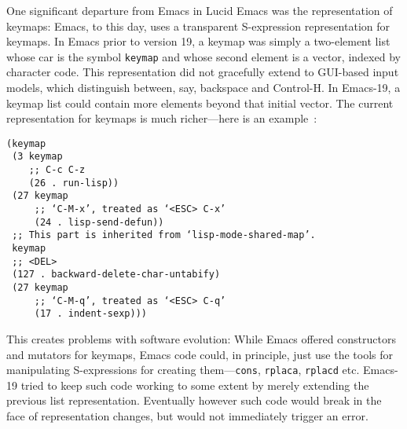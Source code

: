\documentclass[format=acmsmall, review=false, screen=true]{acmart}
\begin{document}
One significant departure from Emacs in Lucid Emacs was the
representation of keymaps: Emacs, to this day, uses a transparent
S-expression representation for keymaps.
In Emacs prior to version 19, a keymap was
simply a two-element list whose car is the symbol \texttt{keymap} and
whose second element is a vector, indexed by character code.
This
representation did not gracefully extend to GUI-based input models,
which distinguish between, say, backspace and Control-H.
In Emacs-19, a keymap list could contain more elements beyond that
initial vector.
The current representation for keymaps is much richer---here is an
example~\cite{ELispManual2018}:
%
\begin{verbatim}
(keymap
 (3 keymap
    ;; C-c C-z
    (26 . run-lisp))
 (27 keymap
     ;; ‘C-M-x’, treated as ‘<ESC> C-x’
     (24 . lisp-send-defun))
 ;; This part is inherited from ‘lisp-mode-shared-map’.
 keymap
 ;; <DEL>
 (127 . backward-delete-char-untabify)
 (27 keymap
     ;; ‘C-M-q’, treated as ‘<ESC> C-q’
     (17 . indent-sexp)))
\end{verbatim}
%
This creates problems with software evolution: While Emacs offered
constructors and mutators for keymaps, Emacs code could, in principle,
just use the tools for manipulating S-expressions for creating
them---\texttt{cons}, \texttt{rplaca}, \texttt{rplacd} etc.
Emacs-19 tried to keep such code working to some extent by merely
extending the previous list representation.
Eventually however such code would break in the face of representation
changes, but would not immediately trigger an error.  
\end{document}
